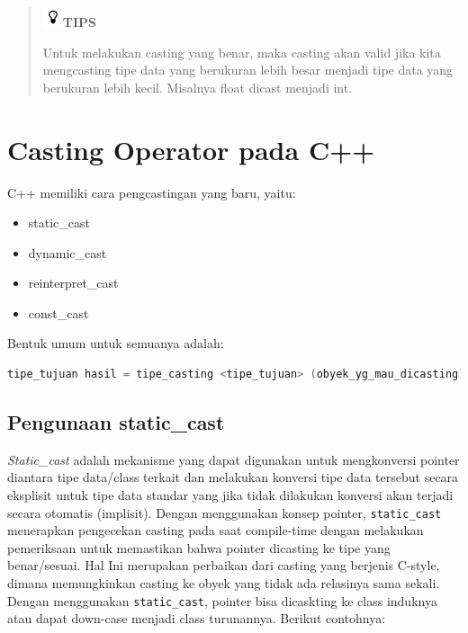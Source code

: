 \begin{quotation}

\includegraphics{../manuscript/images/tips}\textbf{TIPS} 

Untuk melakukan casting yang benar, maka casting akan valid jika kita mengcasting tipe data yang berukuran lebih besar menjadi tipe data yang berukuran lebih kecil. Misalnya float dicast menjadi int.
\end{quotation}


\section{Casting Operator pada C++}\label{casting-operator-pada-c}

C++ memiliki cara pengcastingan yang baru, yaitu:

\begin{itemize}

\item
static\_cast
\item
dynamic\_cast
\item
reinterpret\_cast
\item
const\_cast
\end{itemize}

Bentuk umum untuk semuanya adalah:

\begin{lstlisting}[language=c++, numbers=none]
tipe_tujuan hasil = tipe_casting <tipe_tujuan> (obyek_yg_mau_dicasting);
\end{lstlisting}

\subsection{Pengunaan static\_cast}\label{pengunaan-staticux5fcast}

\emph{Static\_cast} adalah mekanisme yang dapat digunakan untuk
mengkonversi pointer diantara tipe data/class terkait dan melakukan
konversi tipe data tersebut secara eksplisit untuk tipe data standar
yang jika tidak dilakukan konversi akan terjadi secara otomatis
(implisit). Dengan menggunakan konsep pointer, \texttt{static\_cast}
menerapkan pengecekan casting pada saat compile-time dengan melakukan
pemeriksaan untuk memastikan bahwa pointer dicasting ke tipe yang
benar/sesuai. Hal Ini merupakan perbaikan dari casting yang berjenis
C-style, dimana memungkinkan casting ke obyek yang tidak ada relasinya
sama sekali. Dengan menggunakan \texttt{static\_cast}, pointer bisa
dicaskting ke class induknya atau dapat down-case menjadi class
turunannya. Berikut contohnya:

